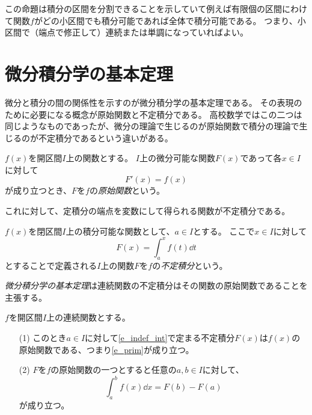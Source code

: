 \begin{remark}
この命題は積分の区間を分割できることを示していて例えば有限個の区間にわけて関数$f$がどの小区間でも積分可能であれば全体で積分可能である。
つまり、小区間で（端点で修正して）連続または単調になっていればよい。
\end{remark}

\section{微分積分学の基本定理}

微分と積分の間の関係性を示すのが微分積分学の基本定理である。
その表現のために必要になる概念が原始関数と不定積分である。
高校数学ではこの二つは同じようなものであったが、微分の理論で生じるのが原始関数で積分の理論で生じるのが不定積分であるという違いがある。

\begin{definition}[原始関数]
$f(x)$を開区間$I$上の関数とする。
$I$上の微分可能な関数$F(x)$であって各$x \in I$に対して
\begin{equation}
\label{e_prim}
F'(x) = f(x)
\end{equation}
が成り立つとき、$F$を$f$の\emph{原始関数}という。
\end{definition}

これに対して、定積分の端点を変数にして得られる関数が不定積分である。

\begin{definition}[不定積分]
$f(x)$を閉区間$I$上の積分可能な関数として、$a \in I$とする。
ここで$x \in I$に対して
\begin{equation}
\label{e_indef_int}
F(x) = \int_a^x f(t)\dd{t}
\end{equation}
とすることで定義される$I$上の関数$F$を$f$の\emph{不定積分}という。
\end{definition}

\emph{微分積分学の基本定理}は連続関数の不定積分はその関数の原始関数であることを主張する。

\begin{theorem}[微分積分学の基本定理]
$f$を開区間$I$上の連続関数とする。
\begin{itemize}
\item[(1)]
このとき$a \in I$に対して\eqref{e_indef_int}で定まる不定積分$F(x)$は$f(x)$の原始関数である、つまり\eqref{e_prim}が成り立つ。
\item[(2)]
$F$を$f$の原始関数の一つとすると任意の$a, b \in I$に対して、
$$
\int_a^b f(x)\dd{x} = F(b)-F(a)
$$
が成り立つ。
\end{itemize}
\end{theorem}

